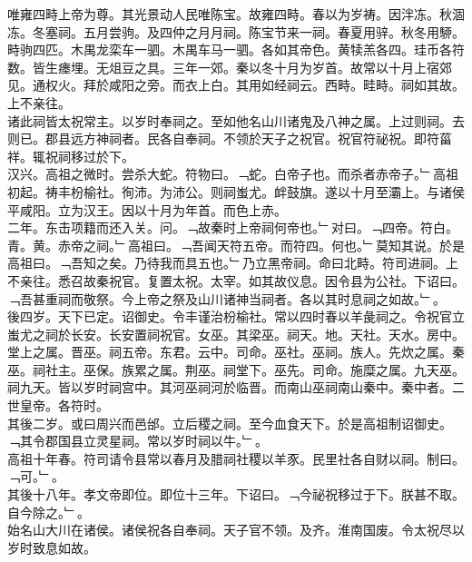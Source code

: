 \documentclass{zhvt-classic}
\begin{document}
\hspace*{2em}唯雍四畤上帝为尊。其光景动人民唯陈宝。故雍四畤。春以为岁祷。因泮冻。秋涸冻。冬塞祠。五月尝驹。及四仲之月月祠。陈宝节来一祠。春夏用骍。秋冬用駵。畤驹四匹。木禺龙栾车一驷。木禺车马一驷。各如其帝色。黄犊羔各四。珪币各符数。皆生瘗埋。无俎豆之具。三年一郊。秦以冬十月为岁首。故常以十月上宿郊见。通权火。拜於咸阳之旁。而衣上白。其用如经祠云。西畤。畦畤。祠如其故。上不亲往。\\
\hspace*{2em}诸此祠皆太祝常主。以岁时奉祠之。至如他名山川诸鬼及八神之属。上过则祠。去则已。郡县远方神祠者。民各自奉祠。不领於天子之祝官。祝官符祕祝。即符菑祥。辄祝祠移过於下。\\
\hspace*{2em}汉兴。高祖之微时。尝杀大蛇。符物曰。﹁蛇。白帝子也。而杀者赤帝子。﹂高祖初起。祷丰枌榆社。徇沛。为沛公。则祠蚩尤。衅鼓旗。遂以十月至灞上。与诸侯平咸阳。立为汉王。因以十月为年首。而色上赤。\\
\hspace*{2em}二年。东击项籍而还入关。问。﹁故秦时上帝祠何帝也。﹂对曰。﹁四帝。符白。青。黄。赤帝之祠。﹂高祖曰。﹁吾闻天符五帝。而符四。何也。﹂莫知其说。於是高祖曰。﹁吾知之矣。乃待我而具五也。﹂乃立黑帝祠。命曰北畤。符司进祠。上不亲往。悉召故秦祝官。复置太祝。太宰。如其故仪息。因令县为公社。下诏曰。﹁吾甚重祠而敬祭。今上帝之祭及山川诸神当祠者。各以其时息祠之如故。﹂。\\
\hspace*{2em}後四岁。天下已定。诏御史。令丰谨治枌榆社。常以四时春以羊彘祠之。令祝官立蚩尤之祠於长安。长安置祠祝官。女巫。其梁巫。祠天。地。天社。天水。房中。堂上之属。晋巫。祠五帝。东君。云中。司命。巫社。巫祠。族人。先炊之属。秦巫。祠社主。巫保。族累之属。荆巫。祠堂下。巫先。司命。施糜之属。九天巫。祠九天。皆以岁时祠宫中。其河巫祠河於临晋。而南山巫祠南山秦中。秦中者。二世皇帝。各符时。\\
\hspace*{2em}其後二岁。或曰周兴而邑邰。立后稷之祠。至今血食天下。於是高祖制诏御史。﹁其令郡国县立灵星祠。常以岁时祠以牛。﹂。\\
\hspace*{2em}高祖十年春。符司请令县常以春月及腊祠社稷以羊豕。民里社各自财以祠。制曰。﹁可。﹂。\\
\hspace*{2em}其後十八年。孝文帝即位。即位十三年。下诏曰。﹁今祕祝移过于下。朕甚不取。自今除之。﹂。\\
\hspace*{2em}始名山大川在诸侯。诸侯祝各自奉祠。天子官不领。及齐。淮南国废。令太祝尽以岁时致息如故。\\
\end{document}
